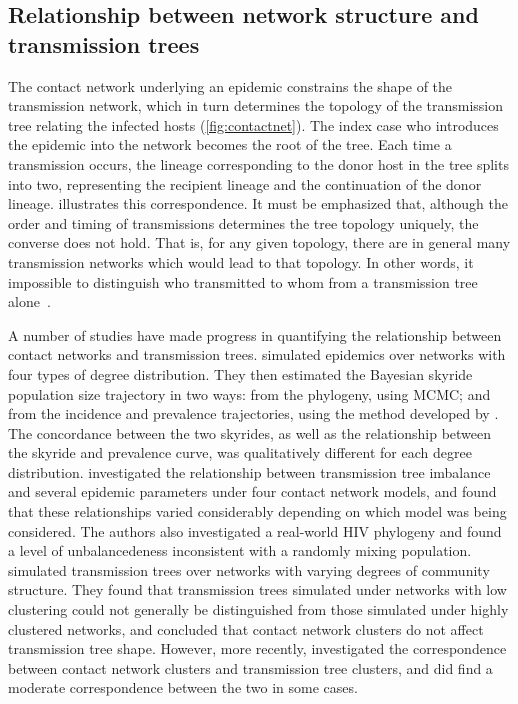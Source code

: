 \subsection{Relationship between network structure and transmission trees}

The contact network underlying an epidemic constrains the shape of the
transmission network, which in turn determines the topology of the transmission
tree relating the infected hosts (\cref{fig:contactnet}). The index case who
introduces the epidemic into the network becomes the root of the tree. Each
time a transmission occurs, the lineage corresponding to the donor host in the
tree splits into two, representing the recipient lineage and the continuation
of the donor lineage.  illustrates this correspondence.
It must be emphasized that, although the order and timing of transmissions
determines the tree topology uniquely, the converse does not hold. That is, for
any given topology, there are in general many transmission networks which would
lead to that topology. In other words, it impossible to distinguish who
transmitted to whom from a transmission tree alone~\autocite{bernard2007hiv}.

A number of studies have made progress in quantifying the relationship between
contact networks and transmission trees. \textcite{o2011contact} simulated
epidemics over networks with four types of degree distribution. They then
estimated the Bayesian skyride~\autocite{minin2008smooth} population size
trajectory in two ways: from the phylogeny, using \gls{MCMC}; and from the
incidence and prevalence trajectories, using the method developed by
\textcite{volz2009phylodynamics}. The concordance between the two skyrides, as
well as the relationship between the skyride and prevalence curve, was
qualitatively different for each degree distribution.
\textcite{leventhal2012inferring} investigated the relationship between
transmission tree imbalance and several epidemic parameters under four contact
network models, and found that these relationships varied considerably
depending on which model was being considered. The authors also investigated a
real-world \gls{HIV} phylogeny and found a level of unbalancedeness
inconsistent with a randomly mixing population. \textcite{welch2011network}
simulated transmission trees over networks with varying degrees of community
structure. They found that transmission trees simulated under networks with low
clustering could not generally be distinguished from those simulated under
highly clustered networks, and concluded that contact network clusters do not
affect transmission tree shape. However, more recently,
\textcite{villandre2016assessment} investigated the correspondence between
contact network clusters and transmission tree clusters, and did find a
moderate correspondence between the two in some cases.

